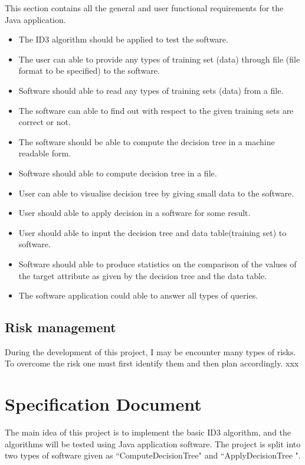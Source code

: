 \documentclass{report}
\begin{document}
This section contains all the general and user functional requirements for the Java application. 
\begin{itemize}
\item The ID3 algorithm should be applied to test the software.
\item The user can able to provide any types of training set (data) through file (file format to be specified) to the software.
\item Software should able to read any types of training sets (data) from a file.
\item The software can able to find out with respect to the given training sets are correct or not. 
\item The software should be able to compute the decision tree in a machine readable form.
\item Software should able to compute decision tree in a file.
\item User can able to visualise decision tree by giving small data to the software.
\item User should able to apply decision in a software for some result.
\item User should able to input the decision tree and data table(training set) to software.
\item Software should able to produce statistics on the comparison of the values of the target attribute as given by the decision tree and the data table.
\item The software application could able to answer all types of queries.

\end{itemize}


\section{Risk management}
\label{sec:riskman}

During the development of this project, I may be encounter many types of risks. To overcome the risk one must first identify them and then plan accordingly.	
xxx


\chapter{Specification Document}
\label{cha:specdoc}

The main idea of this project is to implement the basic ID3 algorithm, and the algorithms will be tested using Java application software. The project is split into two types of software given as ``ComputeDecisionTree" and ``ApplyDecisionTree ". 
\end{document}
